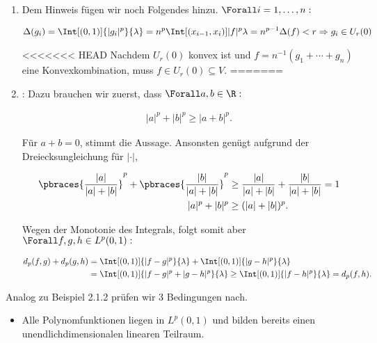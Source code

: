 \begin{solution}
\begin{enumerate}[label = (\alph*)]
\begin{itemize}[label = {}]
  \end{itemize}

  \item
  Dem Hinweis fügen wir noch Folgendes hinzu. $\Forall i = 1, \ldots, n:$

  \begin{align*}
    \Delta(g_i)
    =
    \Int[(0, 1)]{|g_i|^p}{\lambda}
    =
    n^p
    \Int[(x_{i-1}, x_i)]{|f|^p}{\lambda}
    =
    n^{p-1} \Delta(f) < r
    \Rightarrow
    g_i \in U_r(0)
  \end{align*}

<<<<<<< HEAD
  Nachdem $U_r(0)$ konvex ist und $f = n^{-1}(g_1 + \cdots + g_n)$ eine Konvexkombination, muss $f \in U_r(0) \subseteq V$.
=======
  \item
  :
  Dazu brauchen wir zuerst, dass $\Forall a, b \in \R:$

  \begin{align*}
    |a|^p + |b|^p \geq |a + b|^p.
  \end{align*}

  Für $a + b = 0$, stimmt die Aussage.
  Ansonsten genügt aufgrund der Dreiecksungleichung für $|\cdot|$,

  \begin{align*}
    \pbraces{\frac{|a|}{|a| + |b|}}^p +
    \pbraces{\frac{|b|}{|a| + |b|}}^p
    &\geq
    \frac{|a|}{|a| + |b|} +
    \frac{|b|}{|a| + |b|} = 1\\
    |a|^p + |b|^p &\geq (|a| + |b|)^p.
  \end{align*}

  Wegen der Monotonie des Integrals, folgt somit aber $\Forall f, g, h \in L^p(0, 1):$

  \begin{align*}
    d_p(f, g) + d_p(g, h)
    & =
    \Int[(0, 1)]{|f - g|^p}{\lambda} +
    \Int[(0, 1)]{|g - h|^p}{\lambda} \\
    & =
    \Int[(0, 1)]{|f - g|^p + |g - h|^p}{\lambda}
    \geq
    \Int[(0, 1)]{|f - h|^p}{\lambda}
    =
    d_p(f, h).
  \end{align*}

\end{enumerate}

Analog zu Beispiel 2.1.2 prüfen wir 3 Bedingungen nach.

\begin{itemize}
>>>>>>> 1b7d0d0b6e8895e73b1d9ca16132d8822292577d

  \item
  Alle Polynomfunktionen liegen in $L^p(0, 1)$ und bilden bereits einen unendlichdimensionalen linearen Teilraum. \\


\end{itemize}
\end{solution}
